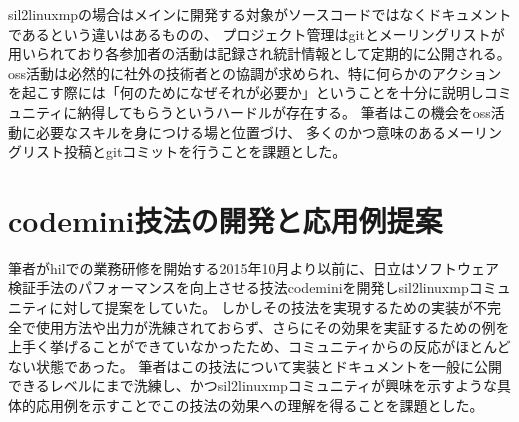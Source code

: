 \par
\acrshort{sil2linuxmp}の場合はメインに開発する対象がソースコードではなくドキュメントであるという違いはあるものの、
プロジェクト管理は\acrshort{git}とメーリングリストが用いられており各参加者の活動は記録され統計情報として定期的に公開される。
\acrshort{oss}活動は必然的に社外の技術者との協調が求められ、特に何らかのアクションを起こす際には「何のためになぜそれが必要か」ということを十分に説明しコミュニティに納得してもらうというハードルが存在する。
筆者はこの機会を\acrshort{oss}活動に必要なスキルを身につける場と位置づけ、%
多くのかつ意味のあるメーリングリスト投稿と\acrshort{git}コミットを行うことを課題とした。
\section{\acrshort{codemini}技法の開発と応用例提案}
筆者が\acrshort{hil}での業務研修を開始する2015年10月より以前に、日立はソフトウェア検証手法のパフォーマンスを向上させる技法\acrshort{codemini}を開発し\acrshort{sil2linuxmp}コミュニティに対して提案をしていた。
しかしその技法を実現するための実装が不完全で使用方法や出力が洗練されておらず、さらにその効果を実証するための例を上手く挙げることができていなかったため、コミュニティからの反応がほとんどない状態であった。
筆者はこの技法について実装とドキュメントを一般に公開できるレベルにまで洗練し、かつ\acrshort{sil2linuxmp}コミュニティが興味を示すような具体的応用例を示すことでこの技法の効果への理解を得ることを課題とした。
